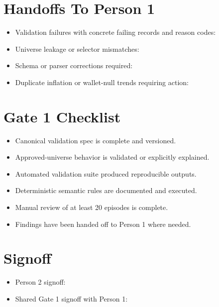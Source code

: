 \documentclass{article}
\begin{document}
\section*{Handoffs To Person 1}

\begin{itemize}
\item Validation failures with concrete failing records and reason codes:
\underline{\hspace{8cm}}
\item Universe leakage or selector mismatches:
\underline{\hspace{8cm}}
\item Schema or parser corrections required:
\underline{\hspace{8cm}}
\item Duplicate inflation or wallet-null trends requiring action:
\underline{\hspace{8cm}}
\end{itemize}

\section*{Gate 1 Checklist}

\begin{itemize}
\item Canonical validation spec is complete and versioned. \underline{\hspace{2cm}}
\item Approved-universe behavior is validated or explicitly explained. \underline{\hspace{2cm}}
\item Automated validation suite produced reproducible outputs. \underline{\hspace{2cm}}
\item Deterministic semantic rules are documented and executed. \underline{\hspace{2cm}}
\item Manual review of at least 20 episodes is complete. \underline{\hspace{2cm}}
\item Findings have been handed off to Person 1 where needed. \underline{\hspace{2cm}}
\end{itemize}

\section*{Signoff}

\begin{itemize}
\item Person 2 signoff: \underline{\hspace{8cm}}
\item Shared Gate 1 signoff with Person 1: \underline{\hspace{8cm}}
\end{itemize}
\end{document}
